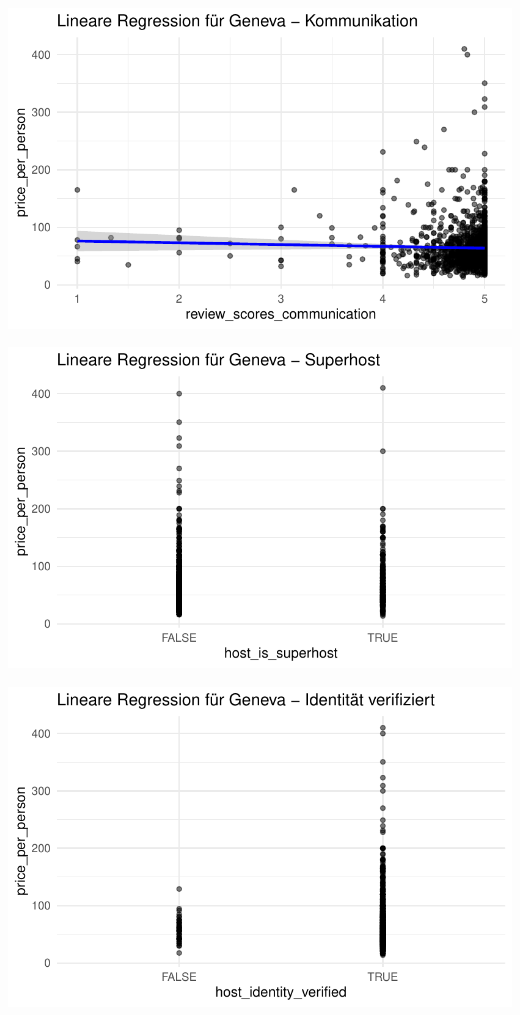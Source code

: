 \documentclass[
  journal,
]{IEEEtran}%
\begin{document}
\includegraphics{main_files/figure-pdf/unnamed-chunk-18-3.pdf}

\includegraphics{main_files/figure-pdf/unnamed-chunk-18-4.pdf}

\includegraphics{main_files/figure-pdf/unnamed-chunk-18-5.pdf}
\end{document}
